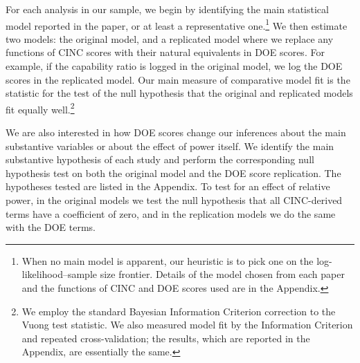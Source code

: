 For each analysis in our sample, we begin by identifying the main statistical model reported in the paper, or at least a representative one.\footnote{%
  When no main model is apparent, our heuristic is to pick one on the log-likelihood--sample size frontier.
  Details of the model chosen from each paper and the functions of CINC and DOE scores used are in the Appendix.
}
We then estimate two models: the original model, and a replicated model where we replace any functions of CINC scores with their natural equivalents in DOE scores.
For example, if the capability ratio is logged in the original model, we log the DOE scores in the replicated model.
Our main measure of comparative model fit is the \citet{Vuong:1989uf} statistic for the test of the null hypothesis that the original and replicated models fit equally well.\footnote{%
  We employ the standard Bayesian Information Criterion \citep{Schwarz:1978kh} correction to the Vuong test statistic.
  We also measured model fit by the \citet{Akaike:1974ih} Information Criterion and repeated cross-validation; the results, which are reported in the Appendix, are essentially the same.
}


We are also interested in how DOE scores change our inferences about the main substantive variables or about the effect of power itself.
We identify the main substantive hypothesis of each study and perform the corresponding null hypothesis test on both the original model and the DOE score replication.
The hypotheses tested are listed in the Appendix.
To test for an effect of relative power, in the original models we test the null hypothesis that all CINC-derived terms have a coefficient of zero, and in the replication models we do the same with the DOE terms.

